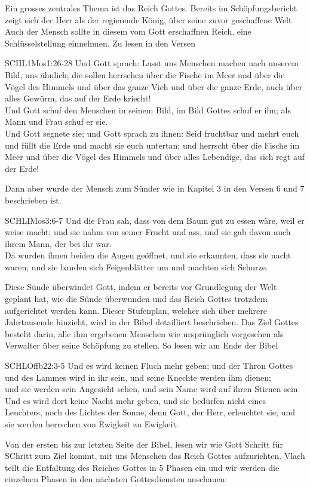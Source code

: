 Ein grosses zentrales Thema ist das Reich Gottes. Bereits im Schöpfungsbericht zeigt sich der Herr als der regierende König, über seine zuvor geschaffene Welt  Auch der Mensch sollte in diesem vom Gott erschaffnen Reich, eine Schlüsselstellung einnehmen. Zu lesen in den Versen
\begin{bibelquote}{SCHL}{1Mos}{1:26-28}
  Und Gott sprach: Lasst uns Menschen machen nach unserem Bild, uns ähnlich; die sollen herrschen über die Fische im Meer und über die Vögel des Himmels und über das ganze Vieh und über die ganze Erde, auch über alles Gewürm, das auf der Erde kriecht!\\
  Und Gott schuf den Menschen in seinem Bild, im Bild Gottes schuf er ihn; als Mann und Frau schuf er sie.\\
  Und Gott segnete sie; und Gott sprach zu ihnen: Seid fruchtbar und mehrt euch und füllt die Erde und macht sie euch untertan; und herrscht über die Fische im Meer und über die Vögel des Himmels und über alles Lebendige, das sich regt auf der Erde!
\end{bibelquote}
Dann aber wurde der Mensch zum Sünder wie in Kapitel 3 in den Versen 6 und 7 beschrieben ist. 
\begin{bibelquote}{SCHL}{IMos}{3:6-7}
Und die Frau sah, dass von dem Baum gut zu essen wäre, weil er weise macht; und sie nahm von seiner Frucht und ass, und sie gab davon auch ihrem Mann, der bei ihr war.\\
Da wurden ihnen beiden die Augen geöffnet, und sie erkannten, dass sie nacht waren; und sie banden sich Feigenblätter um und machten sich Schurze.
\end{bibelquote}
Diese Sünde überwindet Gott, indem er bereits vor Grundlegung der Welt geplant hat, wie die Sünde überwunden und das Reich
Gottes trotzdem aufgerichtet werden kann. Dieser Stufenplan, welcher sich über mehrere Jahrtausende hinzieht, wird in der Bibel detailliert beschrieben. Das Ziel Gottes besteht darin, alle ihm ergebenen Menschen wie ursprünglich vorgesehen als Verwalter über seine Schöpfung zu stellen. So lesen wir am Ende der Bibel
\begin{bibelquote}{SCHL}{Offb}{22:3-5}
Und es wird keinen Fluch mehr geben; und der Thron Gottes und des Lammes wird in ihr sein, und seine Knechte werden ihm dienen;\\
und sie werden sein Angesicht sehen, und sein Name wird auf ihren Stirnen sein\\
Und es wird dort keine Nacht mehr geben, und sie bedürfen nicht eines Leuchters, noch des Lichtes der Sonne, denn Gott, der Herr, erleuchtet sie; und sie werden herrschen von Ewigkeit zu Ewigkeit.
\end{bibelquote}
Von der ersten bis zur letzten Seite der Bibel, lesen wir wie Gott Schritt für SChritt zum Ziel kommt, mit uns Menschen das Reich Gottes aufzurichten.
Vlach teilt die Entfaltung des Reiches Gottes in 5 Phasen ein und wir werden die einzelnen Phasen in den nächsten Gottesdiensten anschauen:
   
